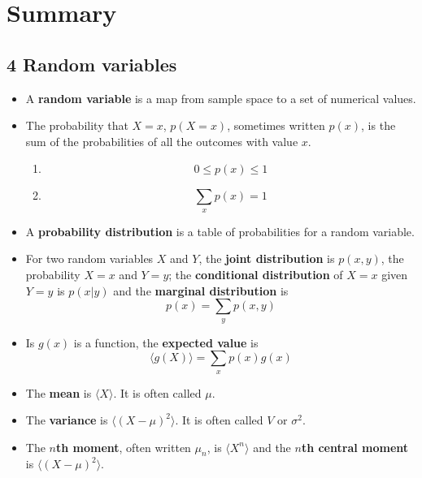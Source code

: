 
\ifind
\section*{Summary}
\else
\subsection*{4 Random variables}
\fi


\begin{itemize}
\item A \textbf{random variable} is a map from sample space to a set of numerical values.
\item The probability that $X=x$, $p(X=x)$, sometimes written $p(x)$,
  is the sum of the probabilities of all the outcomes with value $x$.
  \begin{enumerate}
    \item \begin{equation}
0\le p(x)\le 1
\end{equation}
\item 
\begin{equation}
\sum_x{p(x)}=1
\end{equation}
\end{enumerate}

\item A \textbf{probability distribution} is a table of probabilities for a random variable.

\item For two random variables $X$ and $Y$, the \textbf{joint distribution} is $p(x,y)$, the probability $X=x$ and $Y=y$; the \textbf{conditional distribution} of $X=x$ given $Y=y$ is $p(x|y)$ and the \textbf{marginal distribution} is
  \begin{equation}
    p(x)=\sum_{y}p(x,y)
  \end{equation}

\item Is $g(x)$ is a function, the \textbf{expected value} is
  \begin{equation}
\langle g(X)\rangle = \sum_x p(x)g(x)
  \end{equation}

\item The \textbf{mean} is $\langle X\rangle$. It is often called $\mu$.

\item The \textbf{variance} is $\langle (X-\mu)^2\rangle$. It is often called $V$ or $\sigma^2$.

\item The \textbf{$n$th moment}, often written $\mu_n$, is $\langle X^n\rangle$ and the \textbf{$n$th central moment} is $\langle (X-\mu)^2\rangle$.


\end{itemize}

